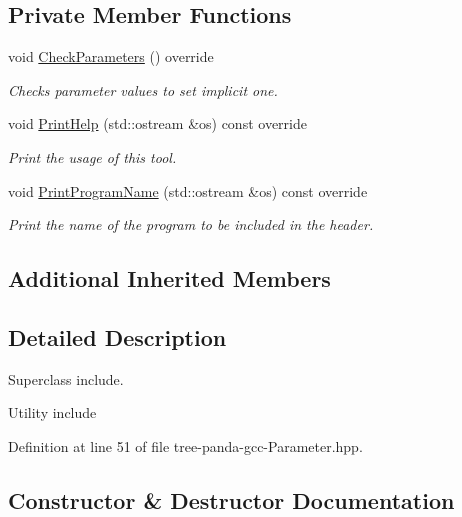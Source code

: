 \subsection*{Private Member Functions}
\begin{DoxyCompactItemize}
\item 
void \hyperlink{classtree__panda__gcc__parameter_a848c8dc5dc64dbd6344d3b0a99f3617b}{Check\+Parameters} () override
\begin{DoxyCompactList}\small\item\em Checks parameter values to set implicit one. \end{DoxyCompactList}\item 
void \hyperlink{classtree__panda__gcc__parameter_a7e40c5706de9fa5cd9fbb231876feb75}{Print\+Help} (std\+::ostream \&os) const override
\begin{DoxyCompactList}\small\item\em Print the usage of this tool. \end{DoxyCompactList}\item 
void \hyperlink{classtree__panda__gcc__parameter_a7ebd9a0cc0edb4bfb56c3df8cac4d87c}{Print\+Program\+Name} (std\+::ostream \&os) const override
\begin{DoxyCompactList}\small\item\em Print the name of the program to be included in the header. \end{DoxyCompactList}\end{DoxyCompactItemize}
\subsection*{Additional Inherited Members}


\subsection{Detailed Description}
Superclass include. 

Utility include 

Definition at line 51 of file tree-\/panda-\/gcc-\/\+Parameter.\+hpp.



\subsection{Constructor \& Destructor Documentation}
\mbox{\label{classtree__panda__gcc__parameter_a29a9274bc3040a0002ac52e882bff585}} 
